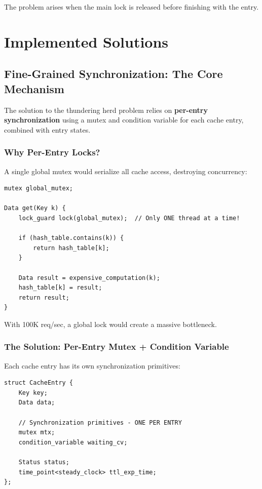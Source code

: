 \documentclass[11pt,a4paper]{article}
\begin{document}
The problem arises when the main lock is released before finishing with
the entry.

\section{Implemented Solutions}

\subsection{Fine-Grained Synchronization: The Core Mechanism}

The solution to the thundering herd problem relies on \textbf{per-entry
synchronization} using a mutex and condition variable for each cache
entry, combined with entry states.

\subsubsection{Why Per-Entry Locks?}

A single global mutex would serialize all cache access, destroying
concurrency:

\begin{lstlisting}[caption=Naive approach with single mutex]
mutex global_mutex;

Data get(Key k) {
    lock_guard lock(global_mutex);  // Only ONE thread at a time!
    
    if (hash_table.contains(k)) {
        return hash_table[k];
    }
    
    Data result = expensive_computation(k);
    hash_table[k] = result;
    return result;
}
\end{lstlisting}

With 100K req/sec, a global lock would create a massive bottleneck.

\subsubsection{The Solution: Per-Entry Mutex + Condition Variable}

Each cache entry has its own synchronization primitives:

\begin{lstlisting}[caption=Per-entry synchronization primitives]
struct CacheEntry {
    Key key;
    Data data;
    
    // Synchronization primitives - ONE PER ENTRY
    mutex mtx;
    condition_variable waiting_cv;
    
    Status status;
    time_point<steady_clock> ttl_exp_time;
};
\end{lstlisting}
\end{document}
